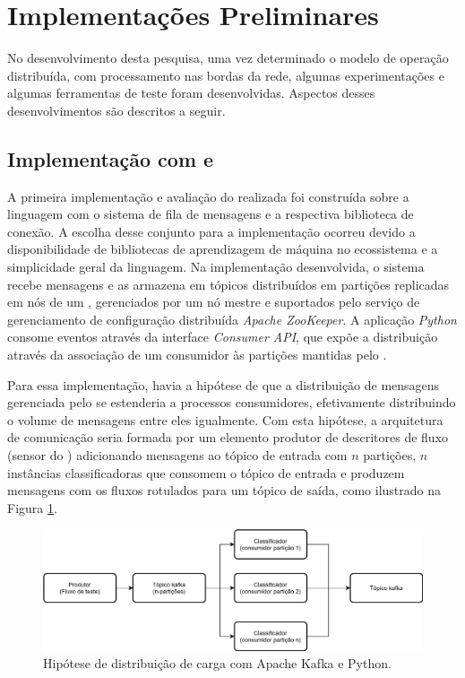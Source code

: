 
\section{Implementações Preliminares}\label{sec:resultados}

No desenvolvimento desta pesquisa, uma vez determinado o modelo de operação
distribuída, com processamento nas bordas da rede, algumas experimentações e
algumas ferramentas de teste foram desenvolvidas. Aspectos desses
desenvolvimentos são descritos a seguir.

\subsection{Implementação com \python e \kafka}

A primeira implementação e avaliação do \mfog realizada foi construída sobre a
linguagem \python com o sistema de fila de mensagens \kafka e a respectiva
biblioteca de conexão.
A escolha desse conjunto para a implementação ocorreu devido a disponibilidade
de bibliotecas de aprendizagem de máquina no ecossistema \python e a
simplicidade geral da linguagem.
Na implementação desenvolvida, o sistema \kafka recebe mensagens e as armazena
em tópicos distribuídos em partições replicadas em nós de um \cluster,
gerenciados por um nó mestre e suportados pelo serviço de gerenciamento de
configuração distribuída \emph{Apache ZooKeeper}.
A aplicação \emph{Python} consome eventos através da interface \emph{Consumer API},
que expõe a distribuição através da associação de um consumidor às partições
mantidas pelo \kafka.

Para essa implementação, havia a hipótese de que a distribuição de
mensagens gerenciada pelo \kafka
se estenderia a processos consumidores, efetivamente distribuindo o volume de
mensagens entre eles igualmente.
Com esta hipótese, a arquitetura de comunicação seria formada por um elemento
produtor de descritores de fluxo (sensor do \nids) adicionando mensagens
ao tópico \kafka de entrada com $n$ partições, $n$ instâncias classificadoras
que consomem o tópico de entrada e produzem mensagens com os fluxos rotulados
para um tópico de saída, como ilustrado na Figura \ref{fig:python-kafka}.

\begin{figure}[htb]
    \centerline{
      \includegraphics[width=\linewidth,page=1]{figures/python-kafka.png}
    }
    \caption{Hipótese de distribuição de carga com Apache Kafka e Python.}
    \label{fig:python-kafka}
\end{figure}


